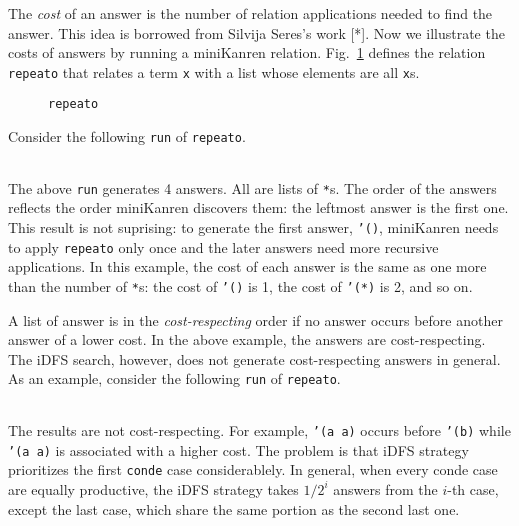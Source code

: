 \documentclass[format=acmlarge, review=true, authordraft=true]{acmart}
\begin{document}
The \emph{cost} of an answer is the number of relation applications needed to
find the answer. This idea is borrowed from Silvija Seres's work [*].
Now we illustrate the costs of answers by running a miniKanren relation.
Fig.~\ref{def-repeato} defines the relation \texttt{repeato} that 
relates a term \texttt{x} with a list whose elements are all \texttt{x}s.

\begin{figure}
  
  \caption{\texttt{repeato}}
  \label{def-repeato}
\end{figure}

Consider the following \texttt{run} of \texttt{repeato}.
\begin{center}
  \begin{tabular}{c}
  
   \end{tabular}
\end{center}

The above \texttt{run} generates 4 answers. All are lists of \texttt{*}s.
The order of the answers reflects the order miniKanren discovers them:
the leftmost answer is the first one. This result is not suprising:
to generate the first answer, \texttt{'()}, miniKanren needs to apply
\texttt{repeato} only once and the later answers need more recursive
applications. In this example, the cost of each answer is the same as
one more than the number of \texttt{*}s: the cost of \texttt{'()} is 1,
the cost of \texttt{'(*)} is 2, and so on.

A list of answer is in the \emph{cost-respecting} order if no answer occurs
before another answer of a lower cost. In the above example, the answers are
cost-respecting. The iDFS search, however, does not generate cost-respecting
answers in general. As an example, consider the following \texttt{run} of
\texttt{repeato}.
\begin{center}
  \begin{tabular}{c}
   
   \end{tabular}
\end{center}

The results are not cost-respecting. For example, \texttt{'(a a)} occurs before
\texttt{'(b)} while \texttt{'(a a)} is associated with a higher cost. 
The problem is that iDFS strategy prioritizes the first \texttt{conde} case
considerablely. In general, when every conde case are equally productive, the iDFS
strategy takes $1/2^{i}$ answers from the $i$-th case, except the last case,
which share the same portion as the second last one.
\end{document}
